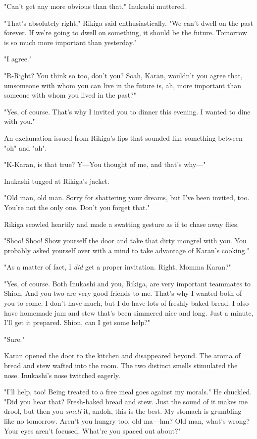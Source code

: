 "Can't get any more obvious than that," Inukashi muttered.

"That's absolutely right," Rikiga said enthusiastically. "We can't dwell
on the past forever. If we're going to dwell on something, it should be
the future. Tomorrow is so much more important than yesterday."

"I agree."

"R-Right? You think so too, don't you? So\el ah, Karan, wouldn't you
agree that, um\el someone with whom you can live in the future is, ah,
more important than someone with whom you lived in the past?"

"Yes, of course. That's why I invited you to dinner this evening. I
wanted to dine with you."

An exclamation issued from Rikiga's lips that sounded like something
between "oh" and "ah".

"K-Karan, is that true? Y---You thought of me, and that's why---"

Inukashi tugged at Rikiga's jacket.

"Old man, old man. Sorry for shattering your dreams, but I've been
invited, too. You're not the only one. Don't you forget that."

Rikiga scowled heartily and made a swatting gesture as if to chase away
flies.

"Shoo! Shoo! Show yourself the door and take that dirty mongrel with
you. You probably asked yourself over with a mind to take advantage of
Karan's cooking."

"As a matter of fact, I \emph{did} get a proper invitation. Right, Momma
Karan?"

"Yes, of course. Both Inukashi and you, Rikiga, are very important
teammates to Shion. And you two are very good friends to me. That's why
I wanted both of you to come. I don't have much, but I do have lots of
freshly-baked bread. I also have homemade jam and stew that's been
simmered nice and long. Just a minute, I'll get it prepared. Shion, can
I get some help?"

"Sure."

Karan opened the door to the kitchen and disappeared beyond. The aroma
of bread and stew wafted into the room. The two distinct smells
stimulated the nose. Inukashi's nose twitched eagerly.

"I'll help, too! Being treated to a free meal goes against my morals."
He chuckled. "Did you hear that? Fresh-baked bread and stew. Just the
sound of it makes me drool, but then you \emph{smell} it, and\el oh, this is
the best. My stomach is grumbling like no tomorrow. Aren't you hungry
too, old ma---hm? Old man, what's wrong? Your eyes aren't focused. What're
you spaced out about?"

